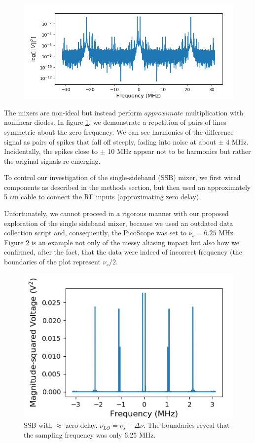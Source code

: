 \documentclass[a4paper]{article}
\begin{document}
\begin{figure}
\centering
\includegraphics[width=.7\linewidth]{7-2}
\caption{}
\label{fig:intermods}
\end{figure}

The mixers are non-ideal but instead perform $approximate$ multiplication with nonlinear diodes. In figure \ref{fig:intermods}, we demonstrate a repetition of pairs of lines symmetric about the zero frequency. We can see harmonics of the difference signal as pairs of spikes that fall off steeply, fading into noise at about $\pm$ 4 MHz. Incidentally, the spikes close to $\pm$ 10 MHz appear not to be harmonics but rather the original signals re-emerging.

To control our investigation of the single-sideband (SSB) mixer, we first wired components as described in the methods section, but then used an approximately 5 cm cable to connect the RF inputs (approximating zero delay). %

Unfortunately, we cannot proceed in a rigorous manner with our proposed exploration of the single sideband mixer, because we used an outdated data collection script and, consequently, the PicoScope was set to $\nu_s = 6.25$ MHz. Figure \ref{fig:failure} is an example not only of the messy aliasing impact but also how we confirmed, after the fact, that the data were indeed of incorrect frequency (the boundaries of the plot represent $\nu_s / 2$.  

\begin{figure}
\centering
\includegraphics[width=.5\linewidth]{7-3/pln}
\caption{SSB with $\approx$ zero delay. $\nu_{LO} = \nu_s - \Delta \nu$. The boundaries reveal that the sampling frequency was only 6.25 MHz.}
\label{fig:failure}
\end{figure}
\end{document}
